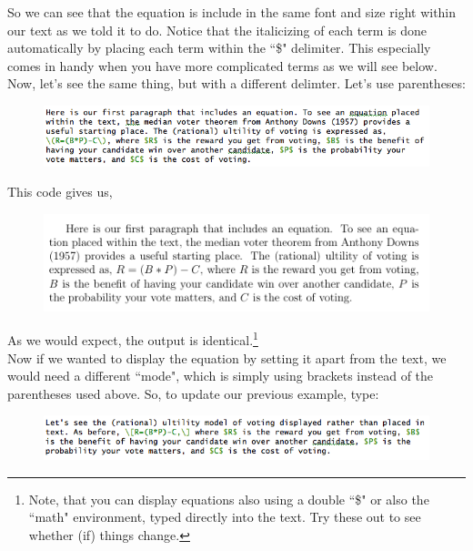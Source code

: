 \documentclass[11pt]{article}
\begin{document}
So we can see that the equation is include in the same font and size right within our text as we told it to do. Notice that the italicizing of each term is done automatically by placing each term within the ``\$" delimiter. This especially comes in handy when you have more complicated terms as we will see below. \\

Now, let's see the same thing, but with a different delimter. Let's use parentheses: \\

\begin{figure}[!h]
	\includegraphics[scale=.5]{CODE2} \\
	\centering
\end{figure}

This code gives us, \\

\begin{figure}[!h]
	\includegraphics[scale=.5]{OUT2} \\
	\centering
\end{figure}

\newpage

As we would expect, the output is identical.\footnote{Note, that you can display equations also using a double ``\$" or also the ``math" environment, typed directly into the text. Try these out to see whether (if) things change.} \\

Now if we wanted to display the equation by setting it apart from the text, we would need a different ``mode", which is simply using brackets instead of the parentheses used above. So, to update our previous example, type: \\

\begin{figure}[!h]
	\includegraphics[scale=.5]{CODE3} \\
	\centering
\end{figure}
\end{document}
